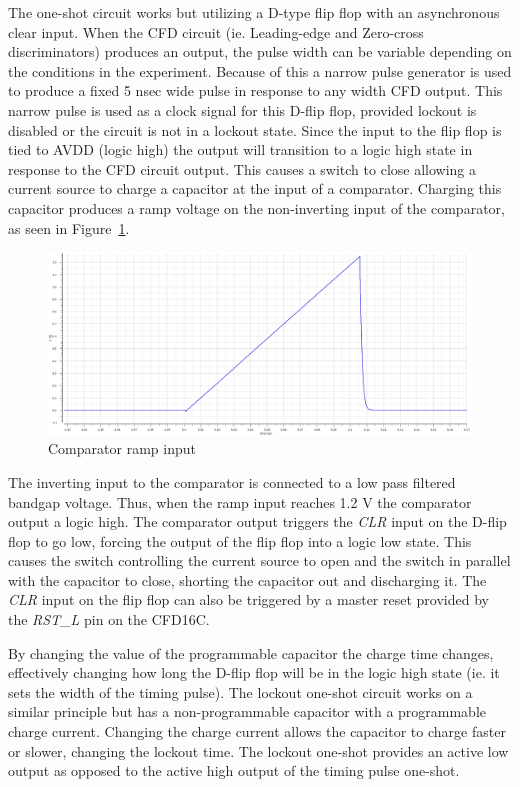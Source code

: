 \documentclass[12pt,oneside,final]{siuethesis}
\theoremstyle{definition}
\begin{document}
\par The one-shot circuit works but utilizing a D-type flip flop with an asynchronous clear input. When the CFD circuit (ie. Leading-edge and Zero-cross discriminators) produces an output, the pulse width can be variable depending on the conditions in the experiment. Because of this a narrow pulse generator is used to produce a fixed 5 nsec wide pulse in response to any width CFD output. This narrow pulse is used as a clock signal for this D-flip flop, provided lockout is disabled or the circuit is not in a lockout state. Since the input to the flip flop is tied to AVDD (logic high) the output will transition to a logic high state in response to the CFD circuit output. This causes a switch to close allowing a current source to charge a capacitor at the input of a comparator. Charging this capacitor produces a ramp voltage on the non-inverting input of the comparator, as seen in Figure~\ref{fig:ramp}.

\begin{figure}[htbp!]
\centering
\includegraphics[scale=.3,keepaspectratio=true]{./ch3_figures/ramp.png} 
\caption{Comparator ramp input}
\label{fig:ramp}
\end{figure}

\par The inverting input to the comparator is connected to a low pass filtered bandgap voltage. Thus, when the ramp input reaches 1.2 V the comparator output a logic high. The comparator output triggers the \emph{CLR} input on the D-flip flop to go low, forcing the output of the flip flop into a logic low state. This causes the switch controlling the current source to open and the switch in parallel with the capacitor to close, shorting the capacitor out and discharging it. The \emph{CLR} input on the flip flop can also be triggered by a master reset provided by the \emph{RST\_L} pin on the CFD16C. 

\par By changing the value of the programmable capacitor the charge time changes, effectively changing how long the D-flip flop will be in the logic high state (ie. it sets the width of the timing pulse). The lockout one-shot circuit works on a similar principle but has a non-programmable capacitor with a programmable charge current. Changing the charge current allows the capacitor to charge faster or slower, changing the lockout time. The lockout one-shot provides an active low output as opposed to the active high output of the timing pulse one-shot.
\end{document}
